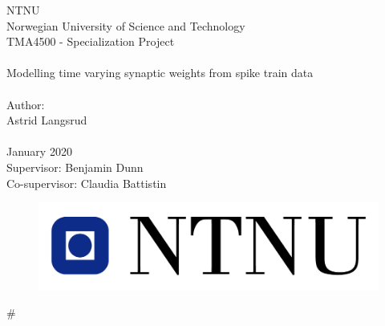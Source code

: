 \documentclass[pdftex,10pt,b5paper,twoside]{book}
\begin{document}
\graphicspath{{fig/}}


\thispagestyle{empty}

\begin{center}

\Large{NTNU}\\
\normalsize{Norwegian University of Science and Technology}\\
[3pc]
\Large{TMA4500 - Specialization Project}\\

\Huge{\hrulefill\\Modelling time varying synaptic weights from spike train data \\\hrulefill}\\[2pc]
\small{Author:}\\\Large{Astrid Langsrud}\\
\mbox{}\\[3pc]
\large{January 2020}\\[2pc]

\small{Supervisor: Benjamin Dunn}\\
\small{Co-supervisor: Claudia Battistin}

\end{center}
\vfill

\begin{figure}[h]
\centering
\includegraphics[scale=0.5]{fig/ntnu-logo.jpg}
\label{fig:frontpage_logo}
\end{figure}


#		%









\end{document}
